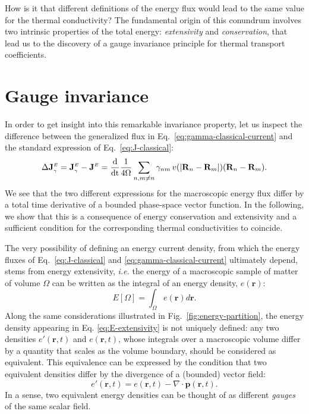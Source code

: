 How is it that different definitions of the energy flux would lead to the same value for the thermal conductivity? The fundamental origin of this conundrum involves two intrinsic properties of the total energy: \emph{extensivity} and \emph{conservation}, that lead us to the discovery of a gauge invariance principle for thermal transport coefficients.


\section{Gauge invariance}  \label{sec:gauge-invariance}

In order to get insight into this remarkable invariance property, let us inspect the difference between the generalized flux in Eq.~\eqref{eq:gamma-classical-current} and the standard expression of Eq.~\eqref{eq:J-classical}:
\begin{equation}
  \rDelta\mathbf{J}^\smallE_{\smallgamma} =\mathbf{J}^\smallE_{\smallgamma}-\mathbf{J}^\smallE  =\frac{\mathrm{d}}{\mathrm{dt}}\frac{1}{4 \rOmega} \sum_{n,m\ne n}  \gamma_{nm} \, v(|\mathbf{R}_{n}-\mathbf{R}_{m}|)  (\mathbf{R}_{n}-\mathbf{R}_{m}). \label{eq:DeltaJ}
\end{equation}
We see that the two different expressions for the macroscopic energy flux differ by a total time derivative of a bounded phase-space vector function. In the following, we show that this is a consequence of energy conservation and extensivity and a sufficient condition for the corresponding thermal conductivities to coincide.

The very possibility of defining an energy current density, from which the energy fluxes of Eq.~\eqref{eq:J-classical} and \eqref{eq:gamma-classical-current} ultimately depend, stems from energy extensivity, \emph{i.e.} the energy of a macroscopic sample of matter of volume $\Omega$ can be written as the integral of an energy density, $e(\mathbf{r})$:
\begin{equation}
  E[\Omega]=\int_{\Omega}e(\mathbf{r})d\mathbf{r}. \label{eq:E-extensivity}
\end{equation}
Along the same considerations illustrated in Fig.~\ref{fig:energy-partition}, the energy density appearing in Eq. \eqref{eq:E-extensivity} is not uniquely defined:  any 
two densities $e'(\mathbf{r},t)$ and $e(\mathbf{r},t)$, whose integrals over a macroscopic volume differ by a quantity that scales as the volume boundary, should be considered as equivalent. 
This equivalence can be expressed by the condition that two equivalent densities differ by the divergence of a (bounded) vector field:
\begin{equation}
  e'(\mathbf{r},t)=e(\mathbf{r},t) - \nabla\cdot \bm{p}(\mathbf{r},t). \label{eq:gauge_transformation}
\end{equation}
In a sense, two equivalent energy densities can be thought of as different \emph{gauges} of the same scalar field. 

